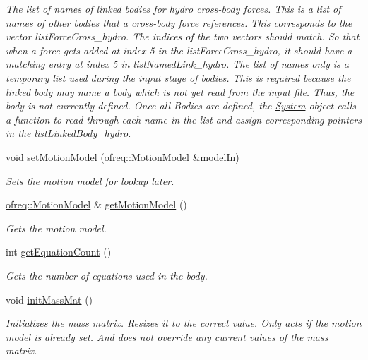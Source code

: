 \begin{DoxyCompactItemize}
\begin{DoxyCompactList}\small\item\em The list of names of linked bodies for hydro cross-\/body forces. This is a list of names of other bodies that a cross-\/body force references. This corresponds to the vector list\-Force\-Cross\-\_\-hydro. The indices of the two vectors should match. So that when a force gets added at index 5 in the list\-Force\-Cross\-\_\-hydro, it should have a matching entry at index 5 in list\-Named\-Link\-\_\-hydro. The list of names only is a temporary list used during the input stage of bodies. This is required because the linked body may name a body which is not yet read from the input file. Thus, the body is not currently defined. Once all Bodies are defined, the \hyperlink{classosea_1_1ofreq_1_1_system}{System} object calls a function to read through each name in the list and assign corresponding pointers in the list\-Linked\-Body\-\_\-hydro. \end{DoxyCompactList}\item 
void \hyperlink{classosea_1_1ofreq_1_1_body_a25b6fa24ac6237272494a7f74a348145}{set\-Motion\-Model} (\hyperlink{classosea_1_1ofreq_1_1_motion_model}{ofreq\-::\-Motion\-Model} \&model\-In)
\begin{DoxyCompactList}\small\item\em Sets the motion model for lookup later. \end{DoxyCompactList}\item 
\hyperlink{classosea_1_1ofreq_1_1_motion_model}{ofreq\-::\-Motion\-Model} \& \hyperlink{classosea_1_1ofreq_1_1_body_a00aa77588d908d6df47a923dc8bf8331}{get\-Motion\-Model} ()
\begin{DoxyCompactList}\small\item\em Gets the motion model. \end{DoxyCompactList}\item 
int \hyperlink{classosea_1_1ofreq_1_1_body_a07a8f186c02f0d5bad4beded83949571}{get\-Equation\-Count} ()
\begin{DoxyCompactList}\small\item\em Gets the number of equations used in the body. \end{DoxyCompactList}\item 
void \hyperlink{classosea_1_1ofreq_1_1_body_a1d5dfa0c6db92dd1d4cf3cd7bafbef34}{init\-Mass\-Mat} ()
\begin{DoxyCompactList}\small\item\em Initializes the mass matrix. Resizes it to the correct value. Only acts if the motion model is already set. And does not override any current values of the mass matrix. \end{DoxyCompactList}\end{DoxyCompactItemize}
